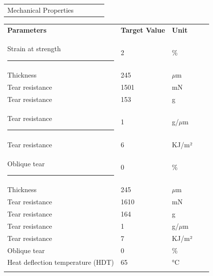 \documentclass{article}
\begin{document}
\begin{center}
\begin{tabularx}
{\textwidth}{X l  l  l  l }\rowcolor{color_title}Mechanical Properties &  &  &  &  \\

\end{tabularx}\begin{paracol}{2}
\begin{tabularx}{0.5\textwidth}
{X l  l  l  l }\textbf{Parameters} & \textbf{Target Value} & \textbf{Unit} &  &  \\
Strain at strength \rule{80pt}{0pt} & 2 & \% &  &  \\
\arrayrulecolor{line_color}\hline
Thickness & 245 & \(\mu\)m &  &  \\
\arrayrulecolor{line_color}\hline
Tear resistance & 1501 & mN &  &  \\
\arrayrulecolor{line_color}\hline
Tear resistance & 153 & g &  &  \\
\arrayrulecolor{line_color}\hline
Tear resistance \rule{80pt}{0pt} & 1 & g/\(\mu\)m &  &  \\
\arrayrulecolor{line_color}\hline
Tear resistance & 6 & KJ/m² &  &  \\
\arrayrulecolor{line_color}\hline
Oblique tear \rule{80pt}{0pt} & 0 & \% &  &  \\
\arrayrulecolor{line_color}\hline
Thickness & 245 & \(\mu\)m &  &  \\
\arrayrulecolor{line_color}\hline
Tear resistance & 1610 & mN &  &  \\
\arrayrulecolor{line_color}\hline
Tear resistance & 164 & g &  &  \\
\arrayrulecolor{line_color}\hline
Tear resistance & 1 & g/\(\mu\)m &  &  \\
\arrayrulecolor{line_color}\hline
Tear resistance & 7 & KJ/m² &  &  \\
\arrayrulecolor{line_color}\hline
Oblique tear & 0 & \% &  &  \\
\arrayrulecolor{line_color}\hline
Heat deflection temperature (HDT) & 65 & °C &  &  \\
\arrayrulecolor{line_color}\hline


\end{tabularx}
\end{paracol}
\end{center}
\end{document}
